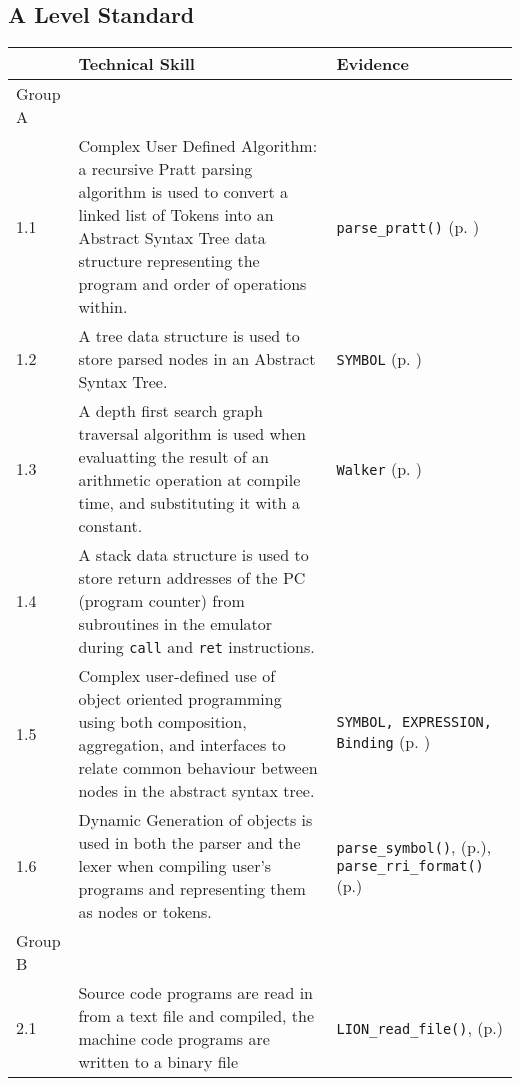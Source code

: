 \subsection{A Level Standard}

\begin{longtable}{ | p{2cm} | p{10cm} | p{3cm} | } 
    \hline
     & Technical Skill & Evidence\\
    \hline 
    Group A & & \\
    \hline
    1.1 & Complex User Defined Algorithm: a recursive Pratt parsing algorithm is used to convert a linked list of Tokens into an Abstract Syntax Tree data structure representing the program and order of operations within. & \texttt{parse\_pratt()} (p. \pageref{PrattParser}) \\
    \hline
    1.2 & A tree data structure is used to store parsed nodes in an Abstract Syntax Tree. & \texttt{SYMBOL} (p. \pageref{AST}) \\
    \hline
    1.3 & A depth first search graph traversal algorithm is used when evaluatting the result of an arithmetic operation at compile time, and substituting it with a constant. & \texttt{Walker} (p. \pageref{Walker})\\
    \hline
    1.4 & A stack data structure is used to store return addresses of the PC (program counter) from subroutines in the emulator during \texttt{call} and \texttt{ret} instructions. & \\
    \hline
    1.5 & Complex user-defined use of object oriented programming using both composition, aggregation, and interfaces to relate common behaviour between nodes in the abstract syntax tree. & \texttt{SYMBOL, EXPRESSION, Binding} (p. \pageref{AST})\\
    \hline
    1.6 & Dynamic Generation of objects is used in both the parser and the lexer when compiling user's programs and representing them as nodes or tokens. & \texttt{parse\_symbol()}, (p.\pageref{CompilerParseSymbol}), \texttt{parse\_rri\_format()} (p.\pageref{AssemblerParseRRIFormat})\\
    \hline
    Group B & & \\
    \hline
    2.1 & Source code programs are read in from a text file and compiled, the machine code programs are written to a binary file & \texttt{LION\_read\_file()}, (p.\pageref{LIONReadFile})\\
    \hline
\end{longtable}
